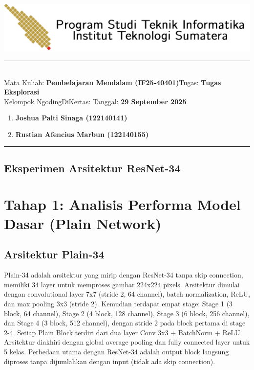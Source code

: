 \documentclass[11pt,a4paper]{article}
\newcommand{\studentlist}{
    \item \textbf{Joshua Palti Sinaga (122140141)}
    \item \textbf{Rustian Afencius Marbun (122140155)}
}
\newcommand{\course}{\textbf{Pembelajaran Mendalam (IF25-40401)}}
\newcommand{\assignment}{\textbf{Tugas Eksplorasi}}
\begin{document}
\thispagestyle{empty}
\begin{center}
\includegraphics[scale = 0.15]{Figure/ifitera-header.png}
\vspace{0.1cm}
\end{center}
\noindent
\rule{17cm}{0.2cm}\\[0.3cm]
Mata Kuliah: \course \hfill Tugas: \assignment\\[0.1cm]
{Kelompok NgodingDiKertas:} \hfill Tanggal: \textbf{29 September 2025}
\begin{enumerate}
    \studentlist
\end{enumerate}
\rule{17cm}{0.05cm}
\vspace{0.1cm}




\begin{center}
\section*{Eksperimen Arsitektur ResNet-34}
\end{center}
\vspace{0.5cm}
\section{Tahap 1: Analisis Performa Model Dasar (Plain Network)}
\subsection{Arsitektur Plain-34}
Plain-34 adalah arsitektur yang mirip dengan ResNet-34 tanpa skip connection, memiliki 34 layer untuk memproses gambar 224x224 pixels. Arsitektur dimulai dengan convolutional layer 7x7 (stride 2, 64 channel), batch normalization, ReLU, dan max pooling 3x3 (stride 2). Kemudian terdapat empat stage: Stage 1 (3 block, 64 channel), Stage 2 (4 block, 128 channel), Stage 3 (6 block, 256 channel), dan Stage 4 (3 block, 512 channel), dengan stride 2 pada block pertama di stage 2-4. Setiap Plain Block terdiri dari dua layer Conv 3x3 + BatchNorm + ReLU. Arsitektur diakhiri dengan global average pooling dan fully connected layer untuk 5 kelas. Perbedaan utama dengan ResNet-34 adalah output block langsung diproses tanpa dijumlahkan dengan input (tidak ada skip connection).
\end{document}

